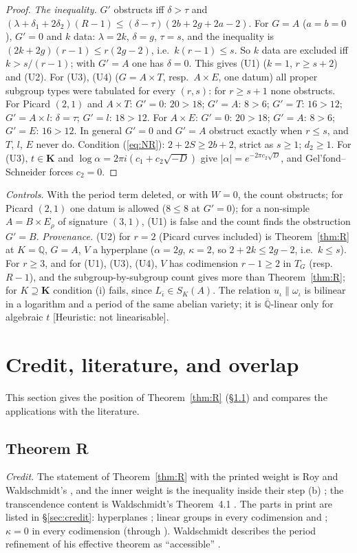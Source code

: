 \documentclass[11pt]{amsart}
\theoremstyle{definition}
\newcommand{\Qb}{\overline{\mathbb{Q}}}
\newcommand{\Q}{\mathbb{Q}}
\newcommand{\lab}[1]{\textup{[#1]}}
\begin{document}
\begin{proof}
\emph{The inequality.} $G'$ obstructs iff $\delta>\tau$ and $(\lambda+\delta_1+2\delta_2)(R-1)\le(\delta-\tau)(2b+2g+2a-2)$.
For $G=A$ ($a=b=0$), $G'=0$ and $k$ data: $\lambda=2k$, $\delta=g$, $\tau=s$, and the inequality is
$(2k+2g)(r-1)\le r(2g-2)$, i.e.\ $k(r-1)\le s$. So $k$ data are excluded iff $k>s/(r-1)$; with $G'=A$ one has
$\delta=0$. This gives (U1) ($k=1$, $r\ge s+2$) and (U2). For (U3), (U4) ($G=A\times T$, resp.\ $A\times E$, one datum) all
proper subgroup types were tabulated for every $(r,s)$: for $r\ge s+1$ none obstructs. For Picard $(2,1)$ and $A\times T$:
$G'=0$: $20>18$; $G'=A$: $8>6$; $G'=T$: $16>12$; $G'=A\times l$: $\delta=\tau$; $G'=l$: $18>12$. For $A\times E$: $G'=0$:
$20>18$; $G'=A$: $8>6$; $G'=E$: $16>12$. In general $G'=0$ and $G'=A$ obstruct exactly when $r\le s$, and $T$, $l$, $E$ never
do. Condition (\ref{eq:NR}): $2+2S\ge2b+2$, strict as $s\ge1$; $d_2\ge1$. For (U3), $t\in\mathbf K$ and $\log\alpha=2\pi i
(c_1+c_2\sqrt{-D})$ give $|\alpha|=e^{-2\pi c_2\sqrt D}$, and Gel'fond--Schneider forces $c_2=0$.
\end{proof}

\noindent\emph{Controls.} With the period term deleted, or with $W=0$, the count obstructs; for Picard $(2,1)$ one datum is
allowed ($8\le8$ at $G'=0$); for a non-simple $A=B\times E_\rho$ of signature $(3,1)$, (U1) is false and the count finds the
obstruction $G'=B$. \emph{Provenance.} (U2) for $r=2$ (Picard curves included) is Theorem~\ref{thm:R} at $K=\Q$, $G=A$, $V$ a
hyperplane ($\alpha=2g$, $\kappa=2$, so $2+2k\le2g-2$, i.e.\ $k\le s$). For $r\ge3$, and for (U1), (U3), (U4), $V$ has codimension
$r-1\ge2$ in $T_G$ (resp.\ $R-1$), and the subgroup-by-subgroup count gives more than Theorem~\ref{thm:R}; for $K\supseteq\mathbf K$
condition (i) fails, since $L_{\bar\iota}\in S_K(A)$. The relation $u_\iota\parallel\omega_\iota$ is bilinear in a logarithm and a
period of the same abelian variety; it is $\Qb$-linear only for algebraic $t$ \lab{Heuristic: not linearisable}.

\section{Credit, literature, and overlap}\label{sec:overlap}
This section gives the position of Theorem~\ref{thm:R} (\S\ref{sec:novR}) and compares the applications with the
literature.

\subsection{Theorem R}\label{sec:novR}
\emph{Credit.} The statement of Theorem~\ref{thm:R} with the printed weight is Roy and Waldschmidt's \cite[Th\'eor\`eme,
p.~363]{RW93}, and the inner weight is the inequality inside their step (b) \cite[p.~364]{RW93}; the transcendence content
is Waldschmidt's Theorem~4.1 \cite{W88}. The parts in print are listed in \S\ref{sec:credit}: hyperplanes \cite[\S5d]{W88};
linear groups in every codimension \cite[\S11.7.3]{W00} and \cite[Thms.~1, 2]{Roy92}; $\kappa=0$ in every codimension
\cite[\S6, remarque (i)]{R1} (through \cite[Remarque 2]{RW93}). Waldschmidt describes the period refinement of his
effective theorem as ``accessible'' \cite[\S7(f)]{W97}.
\end{document}
